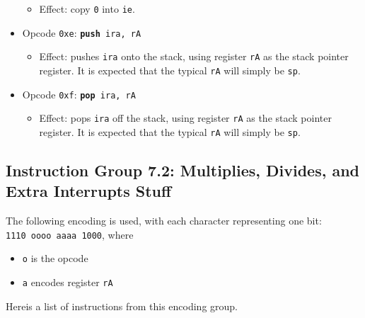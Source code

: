 \documentclass{article}
\begin{document}
\begin{itemize}
\begin{itemize}
			\item Effect:  copy \texttt{0} into \texttt{ie}.
		\end{itemize}
		\item Opcode \texttt{0xe}:
			\texttt{\textbf{push} ira, rA}
		\begin{itemize}
			\item Effect:  pushes \texttt{ira} onto the stack, using
			register \texttt{rA} as the stack pointer register.  It is
			expected that the typical \texttt{rA} will simply be
			\texttt{sp}.
		\end{itemize}
		\item Opcode \texttt{0xf}:
			\texttt{\textbf{pop} ira, rA}
		\begin{itemize}
			\item Effect:  pops \texttt{ira} off the stack, using
			register \texttt{rA} as the stack pointer register.  It is
			expected that the typical \texttt{rA} will simply be
			\texttt{sp}.
		\end{itemize}
	\end{itemize}
	\doublespacing

	\subsection{Instruction Group 7.2:  Multiplies, Divides, and
	Extra Interrupts Stuff}
	The following encoding is used, with each character representing one
	bit:  \\
	\texttt{1110 oooo aaaa 1000}, where

	\singlespacing
	\begin{itemize}
		\item \texttt{o} is the opcode
		\item \texttt{a} encodes register \texttt{rA}
	\end{itemize}
	\doublespacing

	Hereis a list of instructions from this encoding group.
\end{document}
